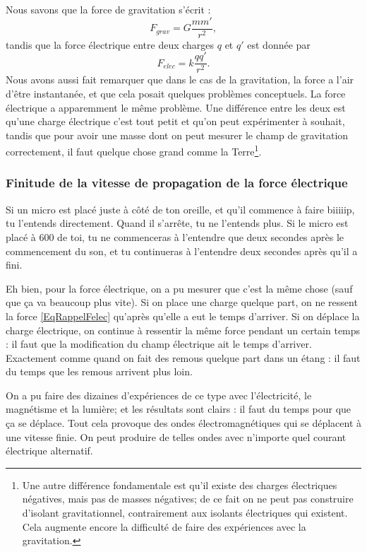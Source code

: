 Nous savons que la force de gravitation s'écrit :
\[
	F_{grav}=G\frac{ mm' }{ r^2 },
\]
tandis que la force électrique entre deux charges \( q\) et \( q'\) est donnée par
\begin{equation}	\label{EqRappelFelec}
	F_{elec}=k\frac{ qq' }{ r^2 }.
\end{equation}
Nous avons aussi fait remarquer que dans le cas de la gravitation, la force a l'air d'être instantanée, et que cela posait quelques problèmes conceptuels. La force électrique a apparemment le même problème. Une différence entre les deux est qu'une charge électrique c'est tout petit et qu'on peut expérimenter à souhait, tandis que pour avoir une masse dont on peut mesurer le champ de gravitation correctement, il faut quelque chose grand comme la Terre\footnote{Une autre différence fondamentale est qu'il existe des charges électriques négatives, mais pas de masses négatives; de ce fait on ne peut pas construire d'isolant gravitationnel, contrairement aux isolants électriques qui existent. Cela augmente encore la difficulté de faire des expériences avec la gravitation.}.

\subsubsection{Finitude de la vitesse de propagation de la force électrique}

Si un micro est placé juste à côté de ton oreille, et qu'il commence à faire biiiiip, tu l'entends directement. Quand il s'arrête, tu ne l'entends plus. Si le micro est placé à \unit{600}{\meter} de toi, tu ne commenceras à l'entendre que deux secondes après le commencement du son, et tu continueras à l'entendre deux secondes après qu'il a fini.

Eh bien, pour la force électrique, on a pu mesurer que c'est la même chose (sauf que ça va beaucoup plus vite). Si on place une charge quelque part, on ne ressent la force \eqref{EqRappelFelec} qu'après qu'elle a eut le temps d'arriver. Si on déplace la charge électrique, on continue à ressentir la même force pendant un certain temps : il faut que la modification du champ électrique ait le temps d'arriver. Exactement comme quand on fait des remous quelque part dans un étang : il faut du temps que les remous arrivent plus loin.

On a pu faire des dizaines d'expériences de ce type avec l'électricité, le magnétisme et la lumière; et les résultats sont clairs : il faut du temps pour que ça se déplace. Tout cela provoque des ondes électromagnétiques qui se déplacent à une vitesse finie. On peut produire de telles ondes avec n'importe quel courant électrique alternatif.

